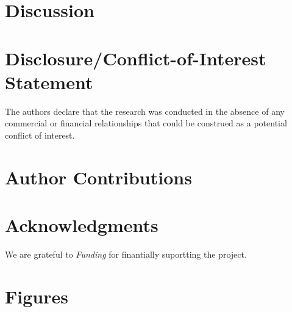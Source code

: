 \documentclass{frontiersSCNS} %
\begin{document}
\section{Discussion}


\section*{Disclosure/Conflict-of-Interest Statement}


The authors declare that the research was conducted in the absence of any commercial or financial relationships that could be construed as a potential conflict of interest.

\section*{Author Contributions}



\section*{Acknowledgments}
 We are grateful to  
\textit{Funding\textcolon} for finantially suportting the project.






\section*{Figures}

\end{document}
